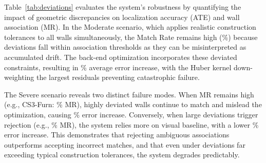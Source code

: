 Table~\ref{tab:deviations} evaluates the system's robustness by quantifying the impact of geometric discrepancies on localization accuracy (ATE) and wall association (MR).  In the Moderate scenario, which applies realistic construction tolerances to all walls simultaneously, the Match Rate remains high (\%) because deviations fall within association thresholds as they can be misinterpreted as accumulated drift. The back-end optimization incorporates these deviated constraints, resulting in \% average error increase, with the Huber kernel down-weighting the largest residuals preventing catastrophic failure.

The Severe scenario reveals two distinct failure modes. When MR remains high (e.g., CS3-Furn: \% MR), highly deviated walls continue to match and mislead the optimization, causing \% error increase. Conversely, when large deviations trigger rejection (e.g., \% MR), the system relies more on visual baseline, with a lower \% error increase.
This demonstrates that rejecting ambiguous associations outperforms accepting incorrect matches, and that even under deviations far exceeding typical construction tolerances, the system degrades predictably.

